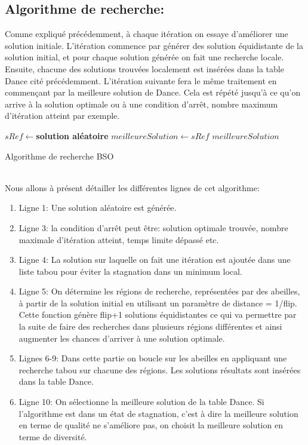 	\subsection{Algorithme de recherche:}
	Comme expliqué précédemment, à chaque itération on essaye d’améliorer une solution initiale. L’itération commence par générer des solution équidistante de la solution initial, et pour chaque solution générée on fait une recherche locale. Ensuite, chacune des solutions trouvées localement est insérées dans la table Dance cité précédemment. L’itération suivante fera le même traitement en commençant par la meilleure solution de Dance. Cela est répété jusqu’à ce qu'on arrive à la solution optimale ou à une condition d’arrêt, nombre maximum d’itération atteint par exemple.
	\begin{algorithm}
		\SetAlgoLined
		$sRef \gets $\textbf{solution aléatoire}\;
		$meilleureSolution \gets sRef$\;
		\Return $meilleureSolution$\;
		\caption{Algorithme de recherche BSO}
	\end{algorithm}\\
	Nous allons à présent détailler les différentes lignes de cet algorithme:
	\begin{enumerate}
		\item Ligne 1: Une solution aléatoire est générée.
		\item Ligne 3: la condition d’arrêt peut être: solution optimale trouvée, nombre maximale d’itération atteint, temps limite dépassé etc.
		\item Ligne 4: La solution sur laquelle on fait une itération est ajoutée dans une liste tabou pour éviter la stagnation dans un minimum local.
		\item Ligne 5: On détermine les régions de recherche, représentées par des abeilles, à partir de la solution initial en utilisant un paramètre de distance = 1/flip. Cette fonction génère flip+1 solutions équidistantes ce qui va permettre par la suite de faire des recherches dans plusieurs régions différentes et ainsi augmenter les chances d’arriver à une solution optimale.
		\item Lignes 6-9: Dans cette partie on boucle sur les abeilles en appliquant une recherche tabou sur chacune des régions. Les solutions résultats sont insérées dans la table Dance.
		\item Ligne 10: On sélectionne la meilleure solution de la table Dance. Si l’algorithme est dans un état de stagnation, c’est à dire la meilleure solution en terme de qualité ne s’améliore pas, on choisit la meilleure solution en terme de diversité.
	\end{enumerate}
